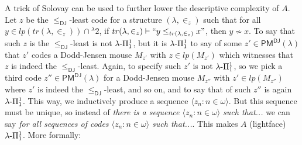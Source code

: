 \documentclass{amsart}
\numberwithin{equation}{section}
\def\hyp{{\hbox{-}}}
\theoremstyle{definition}
\theoremstyle{remark}
\begin{document}
A trick of Solovay can be used to further lower the descriptive complexity of $A$. Let $z$ be the $\leq_{\mathsf{DJ}}$-least code for a structure $(\lambda,\in_{z})$ such that for all $y\in lp(tr(\lambda,\in_{z}))\cap{}^{\lambda}2$, if $tr(\lambda,\in_{z})\vDash``y\leq_{tr(\lambda,\in_{z})} x"$, then $y\nsim x$. To say that such $z$ is the $\leq_{\mathsf{DJ}}$-least is not $\lambda\hyp\Pi^1_1$, but it is $\lambda\hyp\Pi^1_1$ to say of some $z'\in\mathsf{PM^{DJ}}(\lambda)$ that $z'$ codes a Dodd-Jensen mouse $M_{z'}$ with $z\in lp(M_{z'})$ which witnesses that $z$ is indeed the $\leq_{\mathsf{DJ}}$-least. Again, to specify such $z'$ is not $\lambda\hyp\Pi^1_1$, so we pick a third code $z''\in\mathsf{PM^{DJ}}(\lambda)$ for a Dodd-Jensen mouse $M_{z''}$ with $z'\in lp(M_{z''})$ where $z'$ is indeed the $\leq_{\mathsf{DJ}}$-least, and so on, and to say that of such $z''$ is again $\lambda\hyp\Pi^1_1$. This way, we inductively produce a sequence $\langle z_{n}:n\in\omega\rangle$. But this sequence must be unique, so instead of \emph{there is a sequence $\langle z_{n}:n\in\omega\rangle$ such that...} we can say \emph{for all sequences of codes $\langle z_{n}:n\in\omega\rangle$ such that...}. This makes $A$ (lightface) $\lambda\hyp\Pi^1_1$. More formally:
\end{document}
